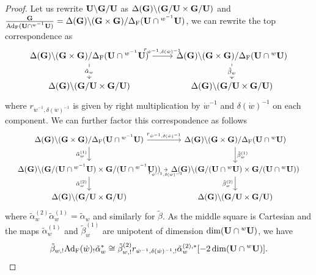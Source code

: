 \documentclass[article, 10pt, oneside, reqno]{amsart}
\theoremstyle{plain}
\theoremstyle{definition}
\theoremstyle{remark}
\begin{document}
\begin{proof}
Let us rewrite $\mathbf{U}\backslash \mathbf{G} /\mathbf{U}$ as $\Delta(\mathbf{G}) \backslash (\mathbf{G}/\mathbf{U} \times \mathbf{G}/\mathbf{U})$ and $\frac{\mathbf{G}}{\mathrm{Ad}_{\mathrm{F}}(\mathbf{U} \cap {^{w^{-1}}\mathbf{U}})} = \Delta(\mathbf{G}) \backslash (\mathbf{G} \times \mathbf{G}) /\Delta_{\mathrm{F}}(\mathbf{U} \cap {^{w^{-1}}\mathbf{U}})$, we can rewrite the top correspondence as 
\[\begin{tikzcd}
	{\Delta(\Gbf) \backslash (\Gbf \times \Gbf) /\Delta_{\Frob}(\Ubf \cap {^{w^{-1}}\Ubf})} & {\Delta(\Gbf) \backslash (\Gbf \times \Gbf) /\Delta_{\Frob}(\Ubf \cap {^{w}\Ubf})} \\
	{\Delta(\Gbf) \backslash (\Gbf/\Ubf \times \Gbf/\Ubf)} & {\Delta(\Gbf) \backslash (\Gbf/\Ubf \times \Gbf/\Ubf)}
	\arrow["{r_{\dot{w}^{-1}, \delta(\dot{w})^{-1}}}", from=1-1, to=1-2]
	\arrow["{\tilde{\alpha}_w}"{description}, from=1-1, to=2-1]
	\arrow["{\tilde{\beta}_w}"{description}, from=1-2, to=2-2]
\end{tikzcd}\]
where $r_{\dot{w}^{-1}, \delta(\dot{w})^{-1}}$ is given by right multiplication by $\dot{w}^{-1}$ and $\delta(\dot{w})^{-1}$ on each component. 
We can further factor this correspondence as follows 
\[\resizebox{0.98\linewidth}{!}{\begin{tikzcd}[column sep=0.5em, ampersand replacement=\&]
	{\Delta(\Gbf) \backslash (\Gbf \times \Gbf) /\Delta_{\Frob}(\Ubf \cap {^{w^{-1}}\Ubf})} \& {\Delta(\Gbf) \backslash (\Gbf \times \Gbf) /\Delta_{\Frob}(\Ubf \cap {^{w}\Ubf})} \\
	{\Delta(\Gbf) \backslash (\Gbf/(\Ubf \cap {^{w^{-1}}\Ubf}) \times \Gbf/(\Ubf \cap {^{w^{-1}}\Ubf}))} \& {\Delta(\Gbf) \backslash (\Gbf/(\Ubf \cap {^{w}\Ubf}) \times \Gbf/(\Ubf \cap {^{w}\Ubf}))} \\
	{\Delta(\Gbf) \backslash (\Gbf/\Ubf \times \Gbf/\Ubf)} \& {\Delta(\Gbf) \backslash (\Gbf/\Ubf \times \Gbf/\Ubf)}
	\arrow["{r_{\dot{w}^{-1}, \delta(\dot{w})^{-1}}}", from=1-1, to=1-2]
	\arrow["{\tilde{\alpha}_w^{(1)}}"', from=1-1, to=2-1]
	\arrow["{\tilde{\beta}_w^{(1)}}", from=1-2, to=2-2]
	\arrow["{r_{\dot{w}^{-1}, \delta(\dot{w})^{-1}}}"', from=2-1, to=2-2]
	\arrow["{\tilde{\alpha}_w^{(2)}}"', from=2-1, to=3-1]
	\arrow["{\tilde{\beta}_w^{(2)}}"', from=2-2, to=3-2]
\end{tikzcd}}\]
where $\tilde{\alpha}_w^{(2)}\tilde{\alpha}_w^{(1)} = \tilde{\alpha}_w$ and similarly for $\tilde{\beta}$. As the middle square is Cartesian and the maps $\tilde{\alpha}_w^{(1)}$ and $\tilde{\beta}_w^{(1)}$ are unipotent of dimension $\dim(\mathbf{U} \cap {^{w}\mathbf{U}})$, we have 
$$\tilde{\beta}_{w,!}\mathrm{Ad}_{\mathrm{F}}(\dot{w})_!\tilde{\alpha}_w^* \cong \tilde{\beta}_{w,!}^{(2)}r_{\dot{w}^{-1}, \delta(\dot{w})^{-1},!}\tilde{\alpha}_w^{(2),*}[-2\dim(\mathbf{U} \cap {^{w}\mathbf{U}})].$$ 


\end{proof}
\end{document}
